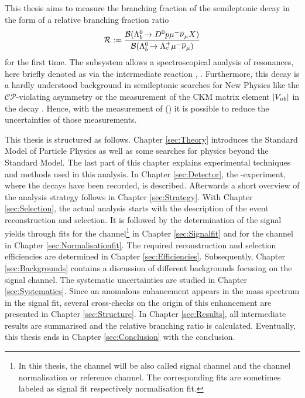 This thesis aims to measure the branching fraction of the semileptonic decay \LbToDpmunuX in the form of a relative branching fraction ratio 
\begin{align*}
    \mathcal{R} := \frac{{\cal B}({{\Lambda}^0_{b}}\!\rightarrow {\ensuremath{{D}^0}}{\ensuremath{p}}{\ensuremath{\mu^-}}{\ensuremath{{\overline{\nu}}_\mu}} X)}{{\cal B}({{\Lambda}^0_{b}}\!\rightarrow {\ensuremath{{\Lambda}^+_{c}}}{\ensuremath{\mu^-}}{\ensuremath{{\overline{\nu}}_\mu}})}
\end{align*}
for the first time.
The \Dz\proton subsystem allows a spectroscopical analysis of \Lc resonances, here briefly denoted as \Lcstar via the intermediate reaction \decay{\Lb}{\Lcstar\mun\neumb}, \decay{\Lcstar}{\Dz\proton}.
Furthermore, this decay is a hardly understood background in semileptonic searches for New Physics like the $\mathcal{CP}$-violating asymmetry \asld \cite{asld_LHCb} or the measurement of the CKM matrix element $|{V_{{u}{b}}}|$ in the decay \decay{\Lb}{\proton\mun\neumb} \cite{SL_Vub}.
Hence, with the measurement of \BR(\LbToDpmunuX) it is possible to reduce the uncertainties of those measurements.

This thesis is structured as follows.
Chapter \ref{sec:Theory} introduces the Standard Model of Particle Physics as well as some searches for physics beyond the Standard Model. The last part of this chapter explains experimental techniques and methods used in this analysis.
In Chapter \ref{sec:Detector}, the \lhcb-experiment, where the decays have been recorded, is described.
Afterwards a short overview of the analysis strategy follows in Chapter \ref{sec:Strategy}.
With Chapter \ref{sec:Selection}, the actual analysis starts with the description of the event reconstruction and selection.
It is followed by the determination of the signal yields through fits for the \LbToDpmunuX channel\footnote{In this thesis, the channel \LbToDpmunuX will be also called signal channel and the \LbToLcmunu channel normalisation or reference channel. The corresponding fits are sometimes labeled as signal fit respectively normalisation fit.}
in Chapter \ref{sec:Signalfit} and for the \LbToLcmunu channel in Chapter \ref{sec:Normalisationfit}.
The required reconstruction and selection efficiencies are determined in Chapter \ref{sec:Efficiencies}.
Subsequently, Chapter \ref{sec:Backgrounds} contains a discussion of different backgrounds focusing on the \LbToDpmunuX signal channel.
The systematic uncertainties are studied in Chapter \ref{sec:Systematics}.
Since an anomalous enhancement appears in the \Dz\proton mass spectrum in the signal fit, several cross-checks on the origin of this enhancement are presented in Chapter \ref{sec:Structure}.
In Chapter \ref{sec:Results}, all intermediate results are summarised and the relative branching ratio \R is calculated.
Eventually, this thesis ends in Chapter \ref{sec:Conclusion} with the conclusion.

